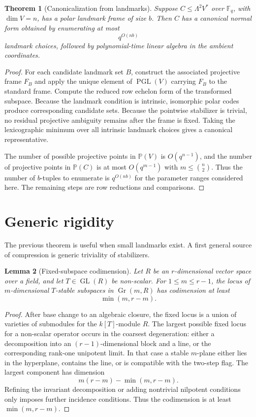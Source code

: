\documentclass[11pt]{article}
\newtheorem{theorem}{Theorem}[section]
\newtheorem{lemma}[theorem]{Lemma}
\begin{document}
\begin{theorem}[Canonicalization from landmarks]
Suppose $C\le\Lambda^2V^*$ over $\mathbb F_q$, with $\dim V=n$, has a polar landmark frame of size $b$. Then $C$ has a canonical normal form obtained by enumerating at most
\[
q^{O(nb)}
\]
landmark choices, followed by polynomial-time linear algebra in the ambient coordinates.
\end{theorem}

\begin{proof}
For each candidate landmark set $B$, construct the associated projective frame $F_B$ and apply the unique element of $\operatorname{PGL}(V)$ carrying $F_B$ to the standard frame. Compute the reduced row echelon form of the transformed subspace. Because the landmark condition is intrinsic, isomorphic polar codes produce corresponding candidate sets. Because the pointwise stabilizer is trivial, no residual projective ambiguity remains after the frame is fixed. Taking the lexicographic minimum over all intrinsic landmark choices gives a canonical representative.

The number of possible projective points in $\mathbb P(V)$ is $O(q^{n-1})$, and the number of projective points in $\mathbb P(C)$ is at most $O(q^{m-1})$ with $m\le\binom n2$. Thus the number of $b$-tuples to enumerate is $q^{O(nb)}$ for the parameter ranges considered here. The remaining steps are row reductions and comparisons.
\end{proof}

\section{Generic rigidity}

The previous theorem is useful when small landmarks exist. A first general source of compression is generic triviality of stabilizers.

\begin{lemma}[Fixed-subspace codimension]
Let $R$ be an $r$-dimensional vector space over a field, and let $T\in\operatorname{GL}(R)$ be non-scalar. For $1\le m\le r-1$, the locus of $m$-dimensional $T$-stable subspaces in $\operatorname{Gr}(m,R)$ has codimension at least
\[
\min(m,r-m).
\]
\end{lemma}

\begin{proof}
After base change to an algebraic closure, the fixed locus is a union of varieties of submodules for the $k[T]$-module $R$. The largest possible fixed locus for a non-scalar operator occurs in the coarsest degeneration: either a decomposition into an $(r-1)$-dimensional block and a line, or the corresponding rank-one unipotent limit. In that case a stable $m$-plane either lies in the hyperplane, contains the line, or is compatible with the two-step flag. The largest component has dimension
\[
m(r-m)-\min(m,r-m).
\]
Refining the invariant decomposition or adding nontrivial nilpotent conditions only imposes further incidence conditions. Thus the codimension is at least $\min(m,r-m)$.
\end{proof}
\end{document}
